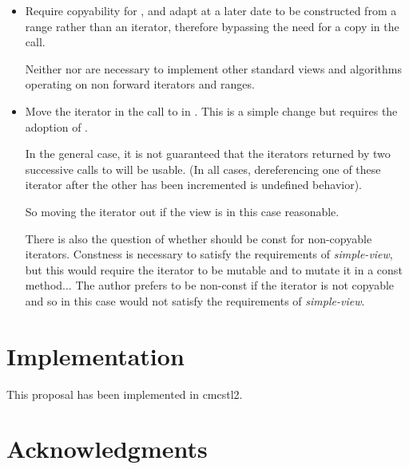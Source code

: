 \documentclass{wg21}
\begin{document}
\begin{itemize}
\item Require copyability for , and adapt  at a later date to be constructed from a range rather than an iterator, therefore bypassing the need for a copy in the  call.

\begin{note}
Neither  nor  are necessary to implement other standard views and algorithms operating on non forward iterators and ranges.
\end{note}

\item Move the iterator in the call to  in .
This is a simple change but requires the adoption of \cite{P1456}.


\begin{note}
	In the general case, it is not guaranteed that the iterators returned by two successive calls to  will be usable.
	(In all cases, dereferencing one of these iterator after the other has been incremented is undefined behavior).
	
	So moving the iterator out if the view is in this case reasonable.
\end{note}

There is also the question of whether  should be const for non-copyable iterators.
Constness is necessary to satisfy the requirements of \emph{simple-view}, but this would require the iterator to be mutable and to mutate it in a const method...
The author prefers  to be non-const if the iterator is not copyable and so in this case
 would not satisfy the requirements of \emph{simple-view}.



\end{itemize}

\section{Implementation}

This proposal has been implemented in cmcstl2.

\section{Acknowledgments}
\end{document}
